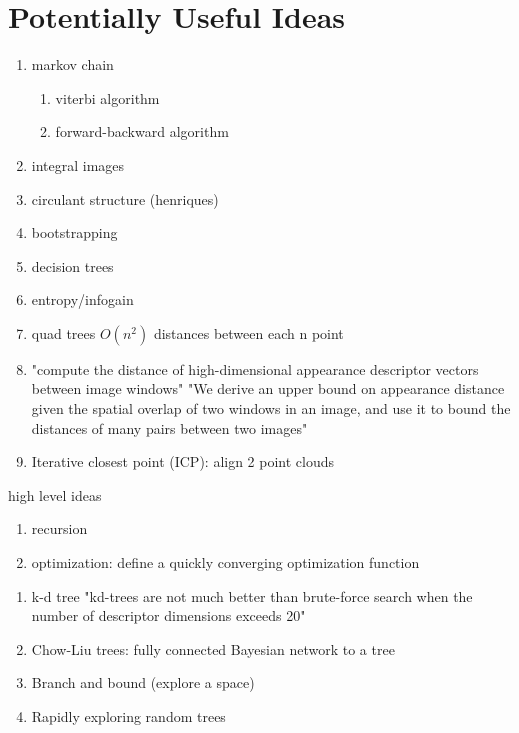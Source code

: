 \section{Potentially Useful Ideas}
\begin{enumerate}
	\item markov chain
	\begin{enumerate}
		\item viterbi algorithm
		\item forward-backward algorithm
	\end{enumerate}
	\item integral images
	\item circulant structure (henriques)
	\item bootstrapping
	\item decision trees
	\item entropy/infogain
	\item quad trees $O(n^2)$ distances between each n point
	\item "compute the distance of high-dimensional appearance descriptor vectors between image windows" "We derive an upper bound on appearance distance given the spatial overlap of two windows in an image, and use it to bound the distances of many pairs between two images" \cite{alexe2011exploiting}
	\item Iterative closest point (ICP): align 2 point clouds

\end{enumerate}

high level ideas
\begin{enumerate}
\item recursion
\item optimization: define a quickly converging optimization function
\end{enumerate}

\begin{enumerate}
\item k-d tree "kd-trees are not much better than brute-force search when the number of descriptor dimensions exceeds 20"
\item Chow-Liu trees: fully connected Bayesian network to a tree
\item Branch and bound (explore a space)
\item Rapidly exploring random trees
\end{enumerate}




